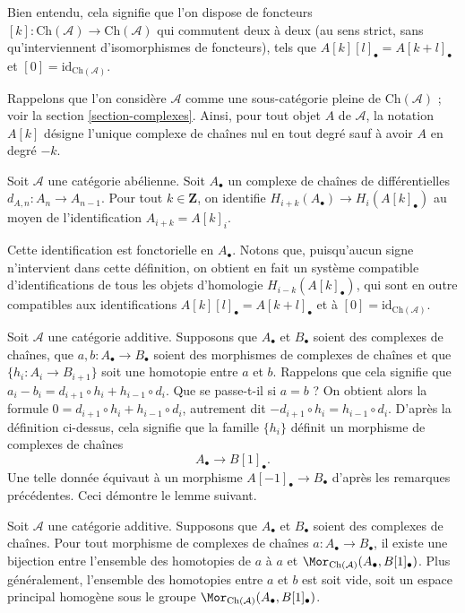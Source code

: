 \noindent
Bien entendu, cela signifie que l'on dispose de foncteurs
$[k] : \text{Ch}(\mathcal{A}) \to \text{Ch}(\mathcal{A})$
qui commutent deux à deux (au sens strict, sans
qu'interviennent d'isomorphismes de foncteurs),
tels que $A[k][l]_\bullet = A[k + l]_\bullet$ et
$[0] = \text{id}_{\text{Ch}(\mathcal{A})}$.

\medskip\noindent
Rappelons que l'on considère $\mathcal{A}$ comme une sous-catégorie pleine de
$\text{Ch}(\mathcal{A})$ ; voir la section \ref{section-complexes}.
Ainsi, pour tout objet $A$ de $\mathcal{A}$, la notation $A[k]$
désigne l'unique complexe de chaînes nul en tout degré sauf à avoir
$A$ en degré $-k$.

\begin{definition}
\label{definition-homology-shift}
Soit $\mathcal{A}$ une catégorie abélienne.
Soit $A_\bullet$ un complexe de chaînes
de différentielles $d_{A, n} : A_n \to A_{n - 1}$.
Pour tout $k \in \mathbf{Z}$, on identifie
{\it $H_{i + k}(A_\bullet) \rightarrow H_i(A[k]_\bullet)$}
au moyen de l'identification
$A_{i + k} = A[k]_i$.
\end{definition}

\noindent
Cette identification est fonctorielle en $A_\bullet$.
Notons que, puisqu'aucun signe n'intervient dans cette
définition, on obtient en fait un système compatible
d'identifications de tous les objets d'homologie
$H_{i - k}(A[k]_\bullet)$, qui sont en outre
compatibles aux identifications
$A[k][l]_\bullet = A[k + l]_\bullet$ et à
$[0] = \text{id}_{\text{Ch}(\mathcal{A})}$.

\medskip\noindent
Soit $\mathcal{A}$ une catégorie additive.
Supposons que $A_\bullet$ et $B_\bullet$ soient des
complexes de chaînes, que $a, b : A_\bullet \to B_\bullet$ soient des
morphismes de complexes de chaînes et que $\{h_i : A_i \to B_{i + 1}\}$
soit une homotopie entre $a$ et $b$. Rappelons que cela signifie
que
$a_i - b_i = d_{i + 1} \circ h_i + h_{i - 1} \circ d_i$.
Que se passe-t-il si $a = b$ ? On obtient alors la formule
$0 = d_{i + 1} \circ h_i + h_{i - 1} \circ d_i$,
autrement dit $ - d_{i + 1} \circ h_i = h_{i - 1} \circ d_i$.
D'après la définition ci-dessus, cela signifie que la famille $\{h_i\}$
définit un morphisme de complexes de chaînes
$$
A_\bullet \longrightarrow B[1]_\bullet.
$$
Une telle donnée équivaut à un morphisme $A[-1]_\bullet \to B_\bullet$
d'après les remarques précédentes. Ceci démontre le lemme suivant.

\begin{lemma}
\label{lemma-homotopy-shift}
Soit $\mathcal{A}$ une catégorie additive.
Supposons que $A_\bullet$ et $B_\bullet$ soient des
complexes de chaînes. Pour tout morphisme de complexes de chaînes
$a : A_\bullet \to B_\bullet$, il existe
une bijection entre l'ensemble des homotopies
de $a$ à $a$ et
$\Mor_{\text{Ch}(\mathcal{A})}(A_\bullet, B[1]_\bullet)$.
Plus généralement, l'ensemble des homotopies entre
$a$ et $b$ est soit vide, soit un espace principal homogène
sous le groupe
$\Mor_{\text{Ch}(\mathcal{A})}(A_\bullet, B[1]_\bullet)$.
\end{lemma}


